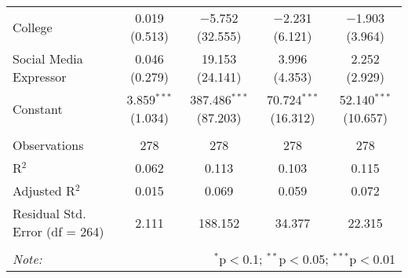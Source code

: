 \begin{table}[H]
{\begin{tabular}{@{\extracolsep{5pt}}lcccc}
  College & 0.019 (0.513) & $-$5.752 (32.555) & $-$2.231 (6.121) & $-$1.903 (3.964) \\ 
  Social Media Expressor & 0.046 (0.279) & 19.153 (24.141) & 3.996 (4.353) & 2.252 (2.929) \\ 
  Constant & 3.859$^{***}$ (1.034) & 387.486$^{***}$ (87.203) & 70.724$^{***}$ (16.312) & 52.140$^{***}$ (10.657) \\ 
 \hline \\[-1.8ex] 
Observations & 278 & 278 & 278 & 278 \\ 
R$^{2}$ & 0.062 & 0.113 & 0.103 & 0.115 \\ 
Adjusted R$^{2}$ & 0.015 & 0.069 & 0.059 & 0.072 \\ 
Residual Std. Error (df = 264) & 2.111 & 188.152 & 34.377 & 22.315 \\ 
\hline 
\hline \\[-1.8ex] 
\textit{Note:}  & \multicolumn{4}{r}{$^{*}$p$<$0.1; $^{**}$p$<$0.05; $^{***}$p$<$0.01} \\ 
\end{tabular} 
}
\end{table} 
